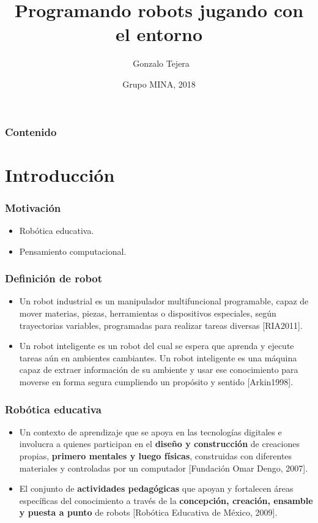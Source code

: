 \documentclass[spanish]{beamer}
\title[Robotito]{Programando robots jugando con el entorno}  %
\author[Gonzalo Tejera]{~Gonzalo Tejera\inst{1}}
\institute[FIng::UdelaR]{\inst{1} Instituto de Computación\\
Facultad de Ingeniería\\
Universidad de la República}
\date[MINA 2018]{Grupo MINA, 2018}
\begin{document}
\begin{frame}
\titlepage %
\end{frame}

\begin{frame}
\frametitle{Contenido} %
\tableofcontents %
\end{frame}

\section{Introducción}
\begin{frame}
	\frametitle{Motivación}
	\begin{itemize}
		\item Robótica educativa.
		\item Pensamiento computacional.
	\end{itemize}
\end{frame}

\begin{frame}
	\frametitle{Definición de robot}
	\begin{itemize}
		\item Un robot industrial es un manipulador multifuncional programable, capaz de mover materias, piezas, herramientas o dispositivos	especiales, según trayectorias variables, programadas para realizar tareas diversas [RIA2011].
		\item Un robot inteligente es un robot del cual se espera que aprenda y ejecute tareas aún en ambientes cambiantes. Un robot inteligente es una máquina capaz de extraer información de su ambiente y usar ese conocimiento para moverse en forma segura cumpliendo un propósito y sentido [Arkin1998].
	\end{itemize}
\end{frame} 

\begin{frame}
	\frametitle{Robótica educativa}
	\begin{itemize}
		\item Un contexto de aprendizaje que se apoya en las tecnologías digitales e involucra a
		quienes participan en el \textbf{diseño y construcción} de creaciones propias, \textbf{primero
		mentales y luego físicas}, construidas con diferentes materiales y controladas por un
		computador [Fundación Omar Dengo, 2007].
		\item El conjunto de \textbf{actividades pedagógicas} que apoyan y fortalecen áreas específicas
		del conocimiento a través de la \textbf{concepción, creación, ensamble y puesta a punto}
		de robots [Robótica Educativa de México, 2009].
	\end{itemize}
\end{frame} 
\end{document}
